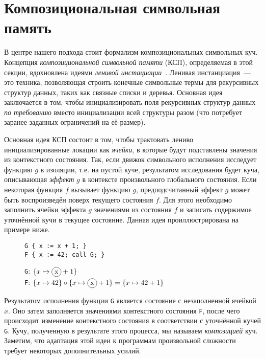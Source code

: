 \section{Композициональная символьная память}
\label{sec:state}

В центре нашего подхода стоит формализм композициональных символьных куч. Концепция \emph{композициональной символьной памяти} (КСП), определяемая в этой секции, вдохновлена идеями \emph{ленивой инстациации}~\cite{khurshid2003generalized,deng2012efficient}. Ленивая инстанциация~--- это техника, позволяющая строить конечные символьные термы для рекурсивных структур данных, таких как связные списки и деревья. Основная идея заключается в том, чтобы инициализировать поля рекурсивных структур данных \emph{по требованию} вместо инициализации всей структуры разом (что потребует заранее заданных ограничений на её размер).

Основная идея КСП состоит в том, чтобы трактовать лениво инициализированные локации как \emph{ячейки}, в которые будут подставлены значения из контекстного состояния. Так, если движок символьного исполнения исследует функцию $g$ в изоляции, т.е. на пустой куче, результатом исследования будет куча, описывающая \emph{эффект} $g$ в контексте произвольного глобального состояния. Если некоторая функция $f$ вызывает функцию $g$, предподсчитанный эффект $g$ может быть воспроизведён поверх текущего состояния $f$. Для этого необходимо заполнить ячейки эффекта $g$ значениями из состояния $f$ и записать содержимое уточнённой кучи в текущее состояние. Данная идея проиллюстрирована на примере ниже.
\begin{figure}[H]
\vspace*{-0.4in}
\begin{minipage}{.37\linewidth}
\begin{lstlisting}[style=demolang]
G { x := x + 1; }
F { x := 42; call G; }
\end{lstlisting}
\end{minipage}
\begin{minipage}{.62\linewidth}
\texttt{G}: $\{x \mapsto\encircle{x} + 1\}$\\
\texttt{F}: $\compose{\{x \mapsto 42\}}{\{x \mapsto\encircle{x} + 1\}}=\{x \mapsto 42 + 1\}$
\end{minipage}
\end{figure}
\vspace*{-0.4in}
Результатом исполнения функции \texttt{G} является состояние с незаполненной ячейкой $x$. Оно затем заполняется значениями контекстного состояния \texttt{F}, после чего происходит изменение контекстного состояния в соответствии с уточнённой кучей \texttt{G}. Кучу, полученную в результате этого процесса, мы называем \emph{композицией} куч. Заметим, что адаптация этой идеи к программам произвольной сложности требует некоторых дополнительных усилий.

